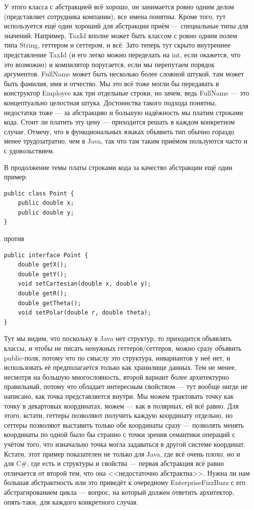 \documentclass[a5paper]{article}
\begin{document}
У этого класса с абстракцией всё хорошо, он занимается ровно одним делом (представляет сотрудника компании), все имена понятны. Кроме того, тут используется ещё один хороший для абстракции приём --- специальные типы для значений. Например, TaxId вполне может быть классом с ровно одним полем типа String, геттером и сеттером, и всё. Зато теперь тут скрыто внутреннее представление TaxId (и его легко можно переделать на int, если окажется, что это возможно) и компилятор поругается, если мы перепутаем порядок аргументов. FullName может быть несколько более сложной штукой, там может быть фамилия, имя и отчество. Мы это всё тоже могли бы передавать в конструктор Employee как три отдельные строки, но зачем, ведь FullName --- это концептуально целостная штука. Достоинства такого подхода понятны, недостатки тоже --- за абстракцию и большую надёжность мы платим строками кода. Стоит ли платить эту цену --- приходится решать в каждом конкретном случае. Отмечу, что в функциональных языках объявить тип обычно гораздо менее трудозатратно, чем в Java, так что там таким приёмом пользуются часто и с удовольствием.

В продолжение темы платы строками кода за качество абстракции ещё один пример:

\begin{verbatim}
public class Point {
    public double x;
    public double y;
}
\end{verbatim}

против

\begin{verbatim}
public interface Point {
    double getX();
    double getY();
    void setCartesian(double x, double y);
    double getR();
    double getTheta();
    void setPolar(double r, double theta);
}
\end{verbatim}

Тут мы видим, что поскольку в Java нет структур, то приходится объявлять классы, и чтобы не писать ненужных геттеров/сеттеров, можно сразу объявить public-поля, потому что по смыслу это структура, инвариантов у неё нет, и использовать её предполагается только как хранилище данных. Тем не менее, несмотря на большую многословность, второй вариант более архитектурно правильный, потому что обладает интересным свойством --- тут вообще нигде не написано, как точка представляется внутри. Мы можем трактовать точку как точку в декартовых координатах, можем --- как в полярных, ей всё равно. Для этого, кстати, геттеры позволяют получить каждую координату отдельно, но сеттеры позволяют выставить только обе координаты сразу --- позволять менять координаты по одной было бы странно с точки зрения семантики операций с учётом того, что изначально точка могла задаваться в другой системе координат. Кстати, этот пример показателен не только для Java, где всё очень плохо, но и для C\#, где есть и структуры и свойства --- первая абстракция всё равно отличается от второй тем, что она <<недостаточно абстрактна>>. Нужна ли нам большая абстрактность или это приведёт к очередному EnterpriseFizzBuzz с его абстрагированием цикла --- вопрос, на который должен ответить архитектор, опять-таки, для каждого конкретного случая.
\end{document}
